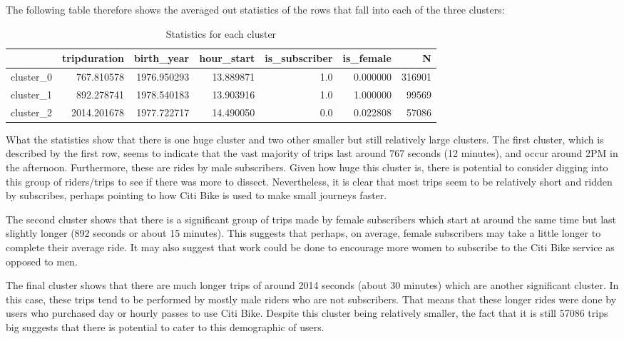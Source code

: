 \documentclass{article}
\begin{document}
The following table therefore shows the averaged out statistics of the rows that fall into each of the three clusters:
\begin{table}[h!]
\centering
\caption{Statistics for each cluster}
\begin{tabular}{||lrrrrrr||}
\hline
{} &  tripduration &   birth\_year &  hour\_start &  is\_subscriber &  is\_female & N\\
\hline
cluster\_0 &    767.810578 &  1976.950293 &   13.889871 &            1.0 &   0.000000 & 316901 \\
cluster\_1 &    892.278741 &  1978.540183 &   13.903916 &            1.0 &   1.000000 & 99569\\
cluster\_2 &   2014.201678 &  1977.722717 &   14.490050 &            0.0 &   0.022808 & 57086\\
\hline
\end{tabular}

\end{table}


What the statistics show that there is one huge cluster and two other smaller but still relatively large clusters. The first cluster, which is described by the first row, seems to indicate that the vast majority of trips last around 767 seconds (12 minutes), and occur around 2PM in the afternoon. Furthermore, these are rides by male subscribers. Given how huge this cluster is, there is potential to consider digging into this group of riders/trips to see if there was more to dissect. Nevertheless, it is clear that most trips seem to be relatively short and ridden by subscribes, perhaps pointing to how Citi Bike is used to make small journeys faster.

The second cluster shows that there is a significant group of trips made by female subscribers which start at around the same time but last slightly longer (892 seconds or about 15 minutes). This suggests that perhaps, on average, female subscribers may take a little longer to complete their average ride. It may also suggest that work could be done to encourage more women to subscribe to the Citi Bike service as opposed to men.

The final cluster shows that there are much longer trips of around 2014 seconds (about 30 minutes) which are another significant cluster. In this case, these trips tend to be performed by mostly male riders who are not subscribers. That means that these longer rides were done by users who purchased day or hourly passes to use Citi Bike. Despite this cluster being relatively smaller, the fact that it is still 57086 trips big suggests that there is potential to cater to this demographic of users.
\end{document}
